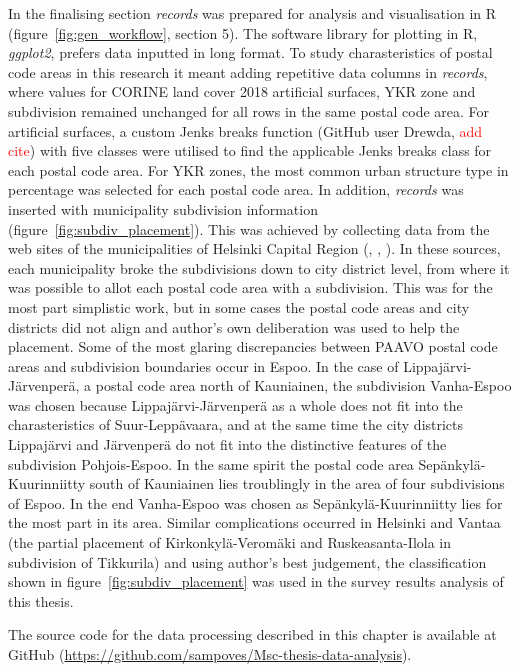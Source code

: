 In the finalising section \textit{records} was prepared for analysis and visualisation in R (figure~\ref{fig:gen_workflow}, section 5).  The software library for plotting in R, \textit{ggplot2}, prefers data inputted in long format. To study charasteristics of postal code areas in this research it meant adding repetitive data columns in \textit{records}, where values for CORINE land cover 2018 artificial surfaces, YKR zone and subdivision remained unchanged for all rows in the same postal code area. For artificial surfaces, a custom Jenks breaks function (GitHub user Drewda, \textcolor{red}{add cite}) with five classes were utilised to find the applicable Jenks breaks class for each postal code area. For YKR zones, the most common urban structure type in percentage was selected for each postal code area. In addition, \textit{records} was inserted with municipality subdivision information (figure~\ref{fig:subdiv_placement}). This was achieved by collecting data from the web sites of the municipalities of Helsinki Capital Region (\cite{Espoonkaupunki2020}, \cite{Helsinginkaupunkiymparistontoimiala2019}, \cite{Vantaankaupunki2019}). In these sources, each municipality broke the subdivisions down to city district level, from where it was possible to allot each postal code area with a subdivision. This was for the most part simplistic work, but in some cases the postal code areas and city districts did not align and author's own deliberation was used to help the placement. Some of the most glaring discrepancies between PAAVO postal code areas and subdivision boundaries occur in Espoo. In the case of Lippajärvi-Järvenperä, a postal code area north of Kauniainen, the subdivision Vanha-Espoo was chosen because Lippajärvi-Järvenperä as a whole does not fit into the charasteristics of Suur-Leppävaara, and at the same time the city districts Lippajärvi and Järvenperä do not fit into the distinctive features of the subdivision Pohjois-Espoo. In the same spirit the postal code area Sepänkylä-Kuurinniitty south of Kauniainen lies troublingly in the area of four subdivisions of Espoo. In the end Vanha-Espoo was chosen as Sepänkylä-Kuurinniitty lies for the most part in its area. Similar complications occurred in Helsinki and Vantaa (the partial placement of Kirkonkylä-Veromäki and Ruskeasanta-Ilola in subdivision of Tikkurila) and using author's best judgement, the classification shown in figure~\ref{fig:subdiv_placement} was used in the survey results analysis of this thesis.

The source code for the data processing described in this chapter is available at GitHub (\textcolor{blue}{\url{https://github.com/sampoves/Msc-thesis-data-analysis}}).

